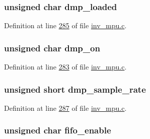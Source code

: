 \subsubsection[{\texorpdfstring{dmp\+\_\+loaded}{dmp_loaded}}]{\setlength{\rightskip}{0pt plus 5cm}unsigned char dmp\+\_\+loaded}\hypertarget{structchip__cfg__s_afc32c3e58317c589014257dc9b1ee04b}{}\label{structchip__cfg__s_afc32c3e58317c589014257dc9b1ee04b}


Definition at line \hyperlink{inv__mpu_8c_source_l00285}{285} of file \hyperlink{inv__mpu_8c_source}{inv\+\_\+mpu.\+c}.

\subsubsection[{\texorpdfstring{dmp\+\_\+on}{dmp_on}}]{\setlength{\rightskip}{0pt plus 5cm}unsigned char dmp\+\_\+on}\hypertarget{structchip__cfg__s_a49fb51079238683b21264827348b5968}{}\label{structchip__cfg__s_a49fb51079238683b21264827348b5968}


Definition at line \hyperlink{inv__mpu_8c_source_l00283}{283} of file \hyperlink{inv__mpu_8c_source}{inv\+\_\+mpu.\+c}.

\subsubsection[{\texorpdfstring{dmp\+\_\+sample\+\_\+rate}{dmp_sample_rate}}]{\setlength{\rightskip}{0pt plus 5cm}unsigned short dmp\+\_\+sample\+\_\+rate}\hypertarget{structchip__cfg__s_a5d17c6049cc8cb74faf5cdb942988294}{}\label{structchip__cfg__s_a5d17c6049cc8cb74faf5cdb942988294}


Definition at line \hyperlink{inv__mpu_8c_source_l00287}{287} of file \hyperlink{inv__mpu_8c_source}{inv\+\_\+mpu.\+c}.

\subsubsection[{\texorpdfstring{fifo\+\_\+enable}{fifo_enable}}]{\setlength{\rightskip}{0pt plus 5cm}unsigned char fifo\+\_\+enable}\hypertarget{structchip__cfg__s_a1f258910658cfcf4bed56c0de8637441}{}\label{structchip__cfg__s_a1f258910658cfcf4bed56c0de8637441}


